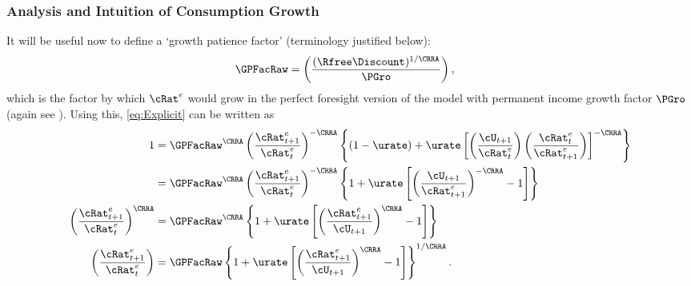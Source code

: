 \documentclass{\handout}
\begin{document}
\subsubsection{Analysis and Intuition of Consumption Growth}
It will be useful now to define a `growth patience factor' (terminology justified below):
\begin{equation}\begin{gathered}\begin{aligned}
  \GPFacRaw & =  \left(\frac{(\Rfree\Discount)^{1/\CRRA}}{\PGro}\right), \label{eq:GPFacRaw}
\end{aligned}\end{gathered}\end{equation}
which is the factor by which ${\cRat}^{e}$ would grow in the perfect foresight version of the model with permanent income growth factor $\PGro$ (again see ).  Using this, \eqref{eq:Explicit} can be written as
\begin{equation}\begin{gathered}\begin{aligned}
        1  & = \GPFacRaw^{\CRRA} \left(\frac{{\cRat}^{e}_{t+1}}{{\cRat}^{e}_{t}}\right)^{-\CRRA} \left\{(1-\urate)+\urate\left[\left(\frac{\cU_{t+1}}{{\cRat}^{e}_{t}}\right)\left(\frac{{\cRat}^{e}_{t}}{{\cRat}^{e}_{t+1}}\right)\right]^{-\CRRA}\right\} 
\\       & = \GPFacRaw^{\CRRA} \left(\frac{{\cRat}^{e}_{t+1}}{{\cRat}^{e}_{t}}\right)^{-\CRRA} \left\{1+\urate\left[\left(\frac{\cU_{t+1}}{{\cRat}^{e}_{t+1}}\right)^{-\CRRA}-1\right]\right\}  \label{eq:BeforePFStep}
\\       \left(\frac{{\cRat}^{e}_{t+1}}{{\cRat}^{e}_{t}}\right)^{\CRRA} & = \GPFacRaw^{\CRRA} \left\{1+\urate\left[\left(\frac{{\cRat}^{e}_{t+1}}{\cU_{t+1}}\right)^{\CRRA}-1\right]\right\} 
\\       \left(\frac{{\cRat}^{e}_{t+1}}{{\cRat}^{e}_{t}}\right) & = {\GPFacRaw} \left\{1+\urate\left[\left(\frac{{\cRat}^{e}_{t+1}}{\cU_{t+1}}\right)^{\CRRA}-1\right]\right\}^{1/\CRRA}.  
\end{aligned}\end{gathered}\end{equation}



\end{document}
